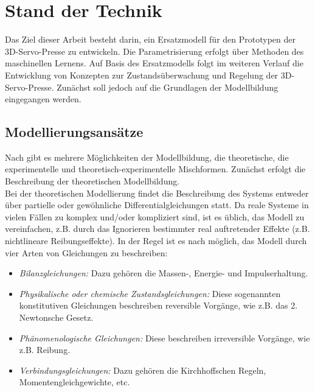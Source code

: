 \chapter{Stand der Technik}

Das Ziel dieser Arbeit besteht darin, ein Ersatzmodell für den Prototypen der 3D-Servo-Presse zu entwickeln. Die Parametrisierung erfolgt über Methoden des maschinellen Lernens. Auf Basis des Ersatzmodells folgt im weiteren Verlauf die Entwicklung von Konzepten zur Zustandsüberwachung und Regelung der 3D-Servo-Presse. Zunächst soll jedoch auf die Grundlagen der Modellbildung eingegangen werden.

\section{Modellierungsansätze}
\label{cha:modell}

Nach \cite{Isermann.2011} gibt es mehrere Möglichkeiten der Modellbildung, die theoretische, die experimentelle und theoretisch-experimentelle Mischformen. Zunächst erfolgt die Beschreibung der theoretischen Modellbildung. \\ 
Bei der theoretischen Modellierung findet die Beschreibung des Systems entweder über partielle oder gewöhnliche Differentialgleichungen statt. Da reale Systeme in vielen Fällen zu komplex und/oder kompliziert sind, ist es üblich, das Modell zu vereinfachen, z.B. durch das Ignorieren bestimmter real auftretender Effekte (z.B. nichtlineare Reibungseffekte). In der Regel ist es nach \cite{Isermann.2011} möglich, das Modell durch vier Arten von Gleichungen zu beschreiben:

\begin{itemize}
	
	\item \textit{Bilanzgleichungen:} Dazu gehören die Massen-, Energie- und Impulserhaltung.
	\item \textit{Physikalische oder chemische Zustandsgleichungen:} Diese sogenannten konstitutiven Gleichungen beschreiben reversible Vorgänge, wie z.B. das 2. Newtonsche Gesetz.
	\item  \textit{Phänomenologische Gleichungen:} Diese  beschreiben irreversible Vorgänge, wie z.B. Reibung.
	\item  \textit{Verbindungsgleichungen:} Dazu gehören die Kirchhoffschen Regeln, Momentengleichgewichte, etc. \cite{Isermann.2011}
	
\end{itemize} 

